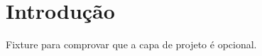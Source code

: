 \documentclass{abntexto-ufc}
\begin{document}
\pretextual

\ufcPrintCover
\ufcPrintTitlePage
\ufcPrintTableOfContents

\textual
\section{Introdução}
Fixture para comprovar que a capa de projeto é opcional.
\end{document}
